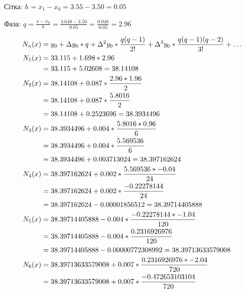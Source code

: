 Сітка: $h = x_1 - x_0 = 3.55 - 3.50 = 0.05$

Фаза: $q = \frac{x - x_0}{h} = \frac{3.648 - 3.50}{0.05} = \frac{0.048}{0.05} = 2.96$

\begin{align*}
    N_n(x) &
    = y_0
    + \Delta y_0 * q
    + \Delta \textsuperscript{2} y_0 * \frac{q(q - 1)}{2!}
    + \Delta \textsuperscript{3} y_0 * \frac{q(q - 1)(q - 2)}{3!}
    + \dots                                                                                 \\
    N_1(x) & = 33.115 + 1.698 * 2.96                                                        \\
           & = 33.115 + 5.02608 = 38.14108                                                  \\
    N_2(x) & = 38.14108 + 0.087 * \frac{2.96 * 1.96}{2}                                     \\
           & = 38.14108 + 0.087 * \frac{5.8016}{2}                                          \\
           & = 38.14108 + 0.2523696 = 38.3934496                                            \\
    N_3(x) & = 38.3934496 + 0.004 * \frac{5.8016 * 0.96}{6}                                 \\
           & = 38.3934496 + 0.004 * \frac{5.569536}{6}                                      \\
           & = 38.3934496 + 0.003713024 = 38.397162624                                      \\
    N_4(x) & = 38.397162624 + 0.002 * \frac{5.569536 * -0.04}{24}                           \\
           & = 38.397162624 + 0.002 * \frac{-0.22278144}{24}                                \\
           & = 38.397162624 - 0.00001856512 = 38.39714405888                                \\
    N_5(x) & = 38.39714405888 - 0.004 * \frac{-0.22278144 * -1.04}{120}                     \\
           & = 38.39714405888 - 0.004 * \frac{0.2316926976}{120}                            \\
           & = 38.39714405888 - 0.00000772308992 = 38.39713633579008                        \\
    N_6(x) & = 38.39713633579008 + 0.007 * \frac{0.2316926976 * -2.04}{720}                 \\
           & = 38.39713633579008 + 0.007 * \frac{-0.472653103104}{720}                      \\

\end{align*}
